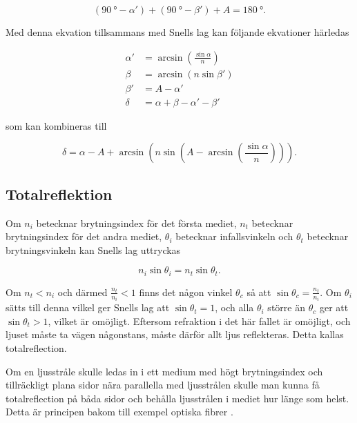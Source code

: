 \documentclass[a4paper]{article}
\begin{document}
  \begin{equation} \label{eq:triSum}
  	(\SI{90}{\degree} - \alpha') + (\SI{90}{\degree} - \beta') + A = \SI{180}{\degree}.
  \end{equation}
  
  Med denna ekvation tillsammans med Snells lag kan följande ekvationer härledas

  \begin{align} 
  \label{eq:alphaPrim}
  \alpha' &= \arcsin\left(\frac{\sin\alpha}{n}\right)\\
  \label{eq:beta}
  \beta &= \arcsin\left(n \sin\beta'\right)\\
  \label{eq:betaPrim}
  \beta' &= A-\alpha'\\
  \label{eq:delta}
  \delta &= \alpha+\beta-\alpha'-\beta'
  \end{align}
  
  som kan kombineras till

  \begin{equation} \label{eq:avlänkning}
  \delta = \alpha-A+\arcsin\left(n \sin\left(A-\arcsin\left(\frac{\sin\alpha}{n}\right)\right)\right).
  \end{equation}

\subsection{Totalreflektion}

	Om $n_i$ betecknar brytningsindex för det första mediet, $n_t$ betecknar brytningsindex för det andra mediet, $\theta_i$ betecknar infallsvinkeln och $\theta_t$ betecknar brytningsvinkeln kan Snells lag uttryckas \cite[pp.~21--22]{pearsonIntroOpt}
	
	\begin{equation} \label{eq:snell}
		n_i\sin\theta_i = n_t\sin\theta_t.
	\end{equation}
	
	Om $n_t < n_i$ och därmed $\frac{n_t}{n_i} < 1$ finns det någon vinkel $\theta_c$ så att $\sin\theta_c = \frac{n_t}{n_i}$. Om $\theta_i$ sätts till denna vilkel ger Snells lag att $\sin\theta_t = 1$, och alla $\theta_i$ större än $\theta_c$ ger att $\sin\theta_t > 1$, vilket är omöjligt. Eftersom refraktion i det här fallet är omöjligt, och ljuset måste ta vägen någonstans, måste därför allt ljus reflekteras. Detta kallas totalreflection.
	
	Om en ljusstråle skulle ledas in i ett medium med högt brytningsindex och tillräckligt plana sidor nära parallella med ljusstrålen skulle man kunna få totalreflection på båda sidor och behålla ljusstrålen i mediet hur länge som helst. Detta är principen bakom till exempel optiska fibrer \cite[p.~261]{pearsonIntroOpt}.
\end{document}
